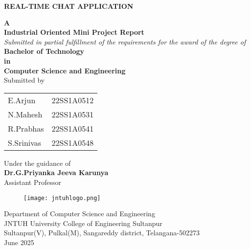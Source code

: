 \documentclass[12pt,a4paper]{report}
\begin{document}
 \begin{titlepage}
  \begin{center}
   \begin{LARGE}
    \textbf{REAL-TIME CHAT APPLICATION}\\[.75cm]
   \end{LARGE}
   \textbf{\large A}\\
   \textbf{\large Industrial Oriented Mini Project Report}\\[.5cm]  
   \textit{\large Submitted in partial fulfillment of the requirements for the award of the degree of}\\[1.5cm]
   \textup{\Large \textbf{Bachelor of Technology}}\\
   \textbf{\Large in}\\
   \textup{\Large \textbf{Computer Science and Engineering}}\\[1cm]
   \textup{\large Submitted by}\\[1cm]
   \begin{table}[ht]
    \centering
    \begin{tabular}{l r}
     {\large E.Arjun} & {\large 22SS1A0512}\\
     {\large N.Mahesh} & {\large 22SS1A0531}\\
     {\large R.Prabhas} & {\large 22SS1A0541}\\
     {\large S.Srinivas} & {\large 22SS1A0548}\\
     
    \end{tabular}
   \end{table}
   \textup{\Large Under the guidance of}\\[.5cm]
   \textbf{\Large Dr.G.Priyanka Jeeva Karunya}\\[.5cm]
   \textup{\Large Assistant Professor}\\[.5cm]
   \begin{figure}[h!]
    \centering 
    \texttt{[image: jntuhlogo.png]}
       \label{fig:enter-label}
   \end{figure}
   \textup{\Large Department of Computer Science and Engineering}\\[.5cm]
   \textup{\Large JNTUH University College of Engineering Sultanpur}\\[.25cm] 
   \textup{\large Sultanpur(V), Pulkal(M), Sangareddy district, Telangana-502273}\\[.25cm] 
   \textup{\Large June 2025}\\[.5cm]\end{center}
 \end{titlepage}
\end{document}
